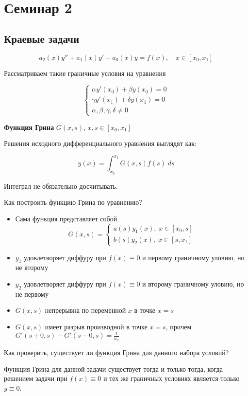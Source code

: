 \section{Семинар 2}

\subsection{Краевые задачи}

$$a_2(x)y'' + a_1(x)y' + a_0(x)y = f(x), \quad x \in [x_0, x_1]$$

Рассматриваем такие граничные условия на уравнения

$$
\begin{cases}
  \alpha y'(x_0) + \beta y(x_0) = 0\\
  \gamma y'(x_1) + \delta y(x_1) = 0\\
  \alpha, \beta, \gamma, \delta \ne 0
\end{cases}
$$

\textbf{Функция Грина} $G(x, s)$, $x, s \in [x_0, x_1]$

Решения исходного дифференциального уравнения выглядят как:

$$y(x) = \int_{x_0}^{x_1} G(x, s)f(s)\; ds$$

Интеграл не обязательно досчитывать.

Как построить функцию Грина по уравнению?

\begin{itemize}
  \item Сама функция представляет собой
  $$G(x, s) = \begin{cases}
    a(s)y_1(x), \; x\in [x_0, s]\\
    b(s)y_2(x), \; x\in [s, x_1]
  \end{cases}$$
  \item $y_1$ удовлетворяет диффуру при $f(x) \equiv 0$ и первому граничному уловию, но не второму
  \item $y_2$ удовлетворяет диффуру при $f(x) \equiv 0$ и второму граничному уловию, но не первому
  \item $G(x, s)$ непрерывна по переменной $x$ в точке $x = s$
  \item $G(x, s)$ имеет разрыв производной в точке $x = s$, причем $G'(s+0, s) - G'(s-0, s) = \frac{1}{a_0}$
\end{itemize}

Как проверить, существует ли функция Грина для данного набора условий?

\begin{proposition}
  Функция Грина для данной задачи существует тогда и только тогда, когда
  решением задачи при $f(x) \equiv 0$ и тех же граничных условиях является только $y \equiv 0$.
\end{proposition}


